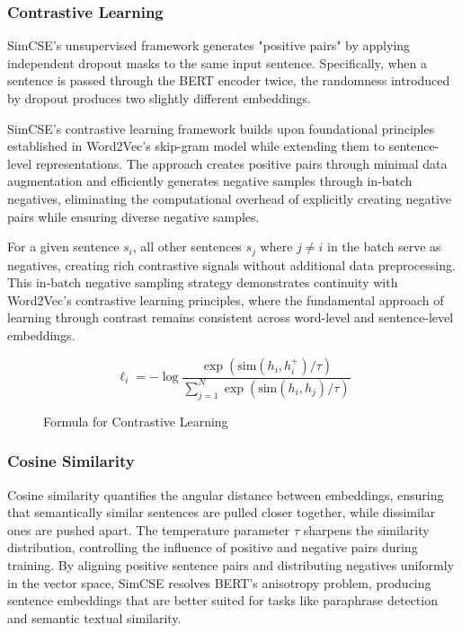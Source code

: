 \subsubsection{Contrastive Learning}

SimCSE's unsupervised framework generates "positive pairs" by applying independent dropout masks to the same input sentence. Specifically, when a sentence is passed through the BERT encoder twice, the randomness introduced by dropout produces two slightly different embeddings.

{\color{maroon}
SimCSE's contrastive learning framework builds upon foundational principles established in Word2Vec's skip-gram model while extending them to sentence-level representations. The approach creates positive pairs through minimal data augmentation and efficiently generates negative samples through in-batch negatives, eliminating the computational overhead of explicitly creating negative pairs while ensuring diverse negative samples.

For a given sentence $s_i$, all other sentences $s_j$ where $j \neq i$ in the batch serve as negatives, creating rich contrastive signals without additional data preprocessing. This in-batch negative sampling strategy demonstrates continuity with Word2Vec's contrastive learning principles, where the fundamental approach of learning through contrast remains consistent across word-level and sentence-level embeddings.
}

\begin{figure}[ht!]
    \centering
    \[
    \ell_i = - \log \frac{\exp(\text{sim}(h_i, h_i^+)/\tau)}{\sum_{j=1}^N \exp(\text{sim}(h_i, h_j)/\tau)}
    \]
    {\color{maroon}\tiny\caption[Formula for Contrastive Learning]{Formula for Contrastive Learning}}
    \label{fig:contrastive_learning}
\end{figure}

\subsubsection{Cosine Similarity}


Cosine similarity quantifies the angular distance between embeddings, ensuring that semantically similar sentences are pulled closer together, while dissimilar ones are pushed apart. The temperature parameter $\tau$ sharpens the similarity distribution, controlling the influence of positive and negative pairs during training. By aligning positive sentence pairs and distributing negatives uniformly in the vector space, SimCSE resolves BERT's anisotropy problem, producing sentence embeddings that are better suited for tasks like paraphrase detection and semantic textual similarity.


